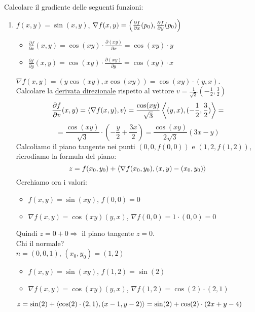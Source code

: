 \begin{eexercise}
  Calcolare il gradiente delle seguenti funzioni:
  \begin{enumerate}
    \item $f(x,y) = \sin(x,y)$, $\nabla f(x,y) = \left(\frac{\partial f}{\partial x}(p_0), \frac{\partial f}{\partial y}(p_0)\right)$
          \begin{itemize}
            \item $\frac{\partial f}{\partial x} (x,y) = \cos(xy)\cdot \frac{\partial (xy)}{\partial x} = \cos(xy)\cdot y$
            \item $\frac{\partial f}{\partial y} (x,y) = \cos(xy)\cdot \frac{\partial (xy)}{\partial y} = \cos(xy)\cdot x$
          \end{itemize}
          $\nabla f(x,y) = \left(y\cos(xy),x\cos(xy)\right) = \cos(xy)\cdot (y,x)$.\\
          Calcolare la \underline{derivata direzionale} rispetto al vettore $v = \frac{1}{\sqrt{3}}
          \left(-\frac{1}{2}, \frac{3}{2}\right)$
          $$\frac{\partial f}{\partial v} (x,y) = \left\langle \nabla f(x,y), v \right\rangle = \frac{\cos(xy)}{\sqrt{3}} \left\langle (y,x),(
            -\frac{1}{2}, \frac{3}{2}) \right\rangle = $$ 
          $$= \frac{\cos(xy)}{\sqrt{3}} \cdot \left(-\frac{y}{2}+\frac{3x}{2}\right) = \frac{\cos(xy)}{2\sqrt{3}} (3x-y)$$
          Calcoliamo il piano tangente nei punti $(0,0,f(0,0))$ e $(1,2,f(1,2))$, ricrodiamo la formula del piano:
          $$z = f(x_0,y_0) + \left\langle \nabla f(x_0,y_0), (x,y)-(x_0,y_0) \right\rangle$$
          Cerchiamo ora i valori:
          \begin{itemize}
            \item $f(x,y) = \sin(xy)$, $f(0,0) = 0$
            \item $\nabla f(x,y) = \cos(xy)(y,x)$, $\nabla f(0,0) = 1\cdot (0,0) = 0$
          \end{itemize}
          Quindi $z = 0 + 0 \Rightarrow$ il piano tangente \ace $z = 0$. \\
          Chi \ace il normale? \\
          $n = (0,0,1)$, $(x_0,y_0) = (1,2)$ 
          \begin{itemize}
            \item $f(x,y) = \sin(xy)$, $f(1,2) = \sin(2)$
            \item $\nabla f(x,y) = \cos(xy)(y,x)$, $\nabla f(1,2) = \cos(2) \cdot (2,1)$
          \end{itemize}
          $z = \sin(2) + \left\langle \cos(2)\cdot (2,1), (x-1, y-2) \right\rangle = \sin(2)+\cos(2)\cdot (2x+y-4)$
  \end{enumerate}
\end{eexercise}








